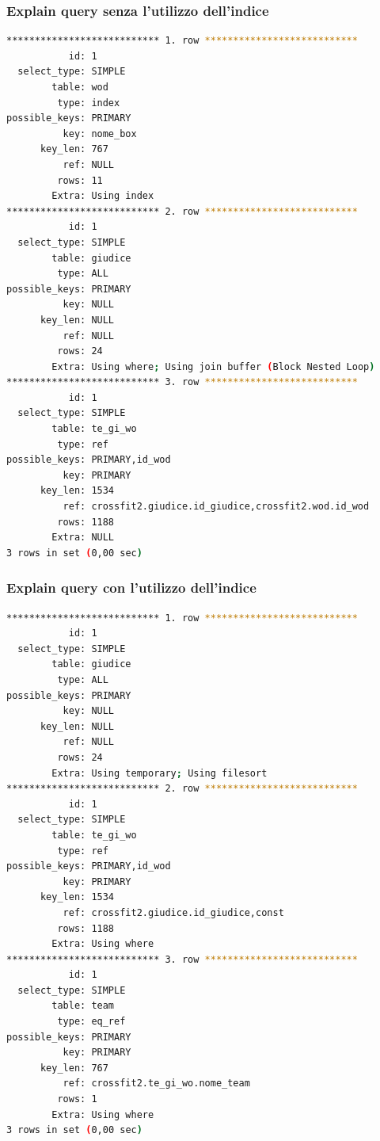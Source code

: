 \documentclass[12pt,a4paper]{article}
\begin{document}
\subsubsection{Explain query senza l'utilizzo dell'indice}
\begin{lstlisting}[language=Bash]
*************************** 1. row ***************************
           id: 1
  select_type: SIMPLE
        table: wod
         type: index
possible_keys: PRIMARY
          key: nome_box
      key_len: 767
          ref: NULL
         rows: 11
        Extra: Using index
*************************** 2. row ***************************
           id: 1
  select_type: SIMPLE
        table: giudice
         type: ALL
possible_keys: PRIMARY
          key: NULL
      key_len: NULL
          ref: NULL
         rows: 24
        Extra: Using where; Using join buffer (Block Nested Loop)
*************************** 3. row ***************************
           id: 1
  select_type: SIMPLE
        table: te_gi_wo
         type: ref
possible_keys: PRIMARY,id_wod
          key: PRIMARY
      key_len: 1534
          ref: crossfit2.giudice.id_giudice,crossfit2.wod.id_wod
         rows: 1188
        Extra: NULL
3 rows in set (0,00 sec)
\end{lstlisting}
\subsubsection{Explain query con l'utilizzo dell'indice}
\begin{lstlisting}[language=Bash]
*************************** 1. row ***************************
           id: 1
  select_type: SIMPLE
        table: giudice
         type: ALL
possible_keys: PRIMARY
          key: NULL
      key_len: NULL
          ref: NULL
         rows: 24
        Extra: Using temporary; Using filesort
*************************** 2. row ***************************
           id: 1
  select_type: SIMPLE
        table: te_gi_wo
         type: ref
possible_keys: PRIMARY,id_wod
          key: PRIMARY
      key_len: 1534
          ref: crossfit2.giudice.id_giudice,const
         rows: 1188
        Extra: Using where
*************************** 3. row ***************************
           id: 1
  select_type: SIMPLE
        table: team
         type: eq_ref
possible_keys: PRIMARY
          key: PRIMARY
      key_len: 767
          ref: crossfit2.te_gi_wo.nome_team
         rows: 1
        Extra: Using where
3 rows in set (0,00 sec)
\end{lstlisting}
\end{document}
